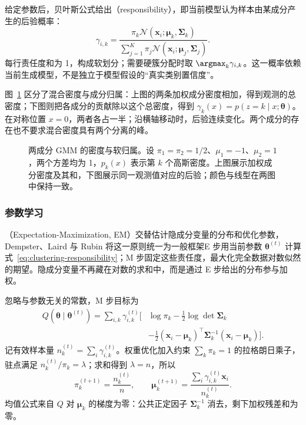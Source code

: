 给定参数后，贝叶斯公式给出（responsibility），即当前模型认为样本由某成分产生的后验概率：
\begin{equation}
 \gamma_{i,k}
 =\frac{\pi_k\mathcal{N}(\bm{x}_i;\bm{\mu}_k,\bm{\Sigma}_k)}
 {\sum_{j=1}^K\pi_j
       \mathcal{N}(\bm{x}_i;\bm{\mu}_j,\bm{\Sigma}_j)}.
 \label{eq:clustering-responsibility}
\end{equation}
每行责任度和为 1，构成软划分；需要硬簇分配时取 $\argmax_k\gamma_{i,k}$。这一概率依赖当前生成模型，不是独立于模型假设的“真实类别置信度”。

图~\ref{fig:clustering-gmm-responsibilities} 区分了混合密度与成分归属：上图的两条加权成分密度相加，得到观测的总密度；下图则把各成分的贡献除以这个总密度，得到 $\gamma_k(x)=p(z=k\mid x;\bm{\theta})$。在对称位置 $x=0$，两者各占一半；沿横轴移动时，后验连续变化。两个成分的存在也不要求混合密度具有两个分离的峰。

\begin{figure}[tbp]
 \centering
 
 \caption{两成分 GMM 的密度与软归属。设 $\pi_1=\pi_2=1/2$、$\mu_1=-1$、$\mu_2=1$，两个方差均为 1，$p_k(x)$ 表示第 $k$ 个高斯密度。上图展示加权成分密度及其和，下图展示同一观测值对应的后验；颜色与线型在两图中保持一致。}
 \label{fig:clustering-gmm-responsibilities}
\end{figure}

\subsubsection{参数学习}

（Expectation-Maximization, EM）交替估计隐成分变量的分布和优化参数，Dempster、Laird 与 Rubin 将这一原则统一为一般框架E 步用当前参数 $\bm{\theta}^{(t)}$ 计算式~\eqref{eq:clustering-responsibility}；M 步固定这些责任度，最大化完全数据对数似然的期望。隐成分变量不再藏在对数的求和中，而是通过 E 步给出的分布参与加权。

忽略与参数无关的常数，M 步目标为
\begin{equation}
 \begin{aligned}
 Q(\bm{\theta}\mid\bm{\theta}^{(t)})
 =\sum_{i,k}\gamma_{i,k}^{(t)}
 \biggl[&\log\pi_k-\frac12\log\det\bm{\Sigma}_k\\
 &-\frac12(\bm{x}_i-\bm{\mu}_k)^\top
 \bm{\Sigma}_k^{-1}(\bm{x}_i-\bm{\mu}_k)\biggr].
 \end{aligned}
 \label{eq:clustering-gmm-q}
\end{equation}
记有效样本量 $n_k^{(t)}=\sum_i\gamma_{i,k}^{(t)}$。权重优化加入约束 $\sum_k\pi_k=1$ 的拉格朗日乘子，驻点满足 $n_k^{(t)}/\pi_k=\lambda$；求和得到 $\lambda=n$，所以
\begin{equation}
 \pi_k^{(t+1)}=\frac{n_k^{(t)}}{n},\qquad
 \bm{\mu}_k^{(t+1)}
 =\frac{\sum_i\gamma_{i,k}^{(t)}\bm{x}_i}{n_k^{(t)}}.
 \label{eq:clustering-gmm-mean}
\end{equation}
均值公式来自 $Q$ 对 $\bm{\mu}_k$ 的梯度为零：公共正定因子 $\bm{\Sigma}_k^{-1}$ 消去，剩下加权残差和为零。


